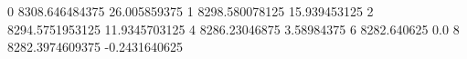 0 8308.646484375 26.005859375
1 8298.580078125 15.939453125
2 8294.5751953125 11.9345703125
4 8286.23046875 3.58984375
6 8282.640625 0.0
8 8282.3974609375 -0.2431640625
